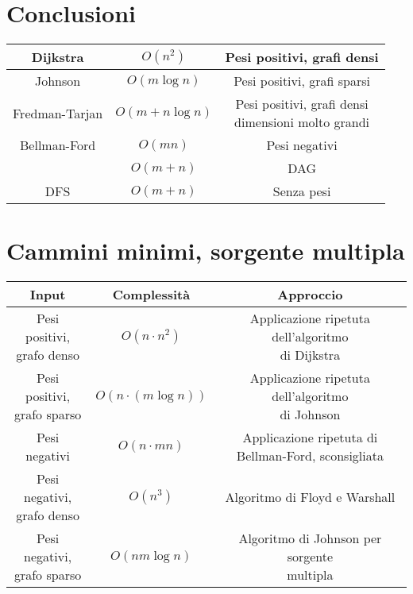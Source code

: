 \section{Conclusioni}
	\begin{center}
		\begin{tabular}{|c|c|c|}
			\hline
			Dijkstra       & $O(n^2)$       & Pesi positivi, grafi densi           \\
			\hline
			Johnson        & $O(m\log n)$   & Pesi positivi, grafi sparsi          \\
			\hline
			Fredman-Tarjan & $O(m+n\log n)$ & \makecell{Pesi positivi, grafi densi \\ dimensioni molto grandi}\\
			\hline
			Bellman-Ford   & $O(mn)$        & Pesi negativi                        \\
			\hline
			               & $O(m+n)$       & DAG                                  \\
			\hline
			DFS            & $O(m+n)$       & Senza pesi                           \\
			\hline
		\end{tabular}
	\end{center}
\section{Cammini minimi, sorgente multipla}
	\begin{center}
		\begin{tabular}{|c|c|c|}
			\hline
			\textbf{Input} & \textbf{Complessit\`a} & \textbf{Approccio}                 \\
			\hline
			\makecell{Pesi positivi,                                                     \\ grafo denso} & $O(n\cdot n^2)$ & \makecell{Applicazione ripetuta dell'algoritmo \\ di Dijkstra}\\
			\hline
			\makecell{Pesi positivi,                                                     \\ grafo sparso}  & $O(n\cdot (m\log n))$ & \makecell{Applicazione ripetuta dell'algoritmo \\ di Johnson}\\
			\hline
			Pesi negativi  & $O(n\cdot mn)$         & \makecell{Applicazione ripetuta di \\ Bellman-Ford, sconsigliata}\\
			\hline
			\makecell{Pesi negativi,                                                     \\ grafo denso} & $O(n^3)$ & Algoritmo di Floyd e Warshall\\
			\hline
			\makecell{Pesi negativi,                                                     \\ grafo sparso} & $O(nm\log n)$ & \makecell{Algoritmo di Johnson per sorgente \\ multipla}\\
			\hline
		\end{tabular}
	\end{center}
